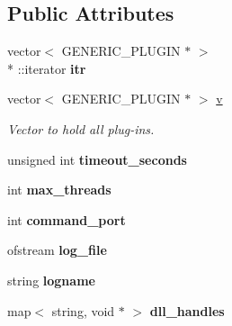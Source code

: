 \subsection*{Public Attributes}
\begin{DoxyCompactItemize}
\item 
\hypertarget{classgeneric__server_a174dc14e1ad533eb80914d6502704c62}{vector$<$ G\-E\-N\-E\-R\-I\-C\-\_\-\-P\-L\-U\-G\-I\-N $\ast$ $>$\\*
\-::iterator {\bfseries itr}}\label{classgeneric__server_a174dc14e1ad533eb80914d6502704c62}

\item 
\hypertarget{classgeneric__server_a3ec385161a1a70bbeabb9c4f9dacaff9}{vector$<$ G\-E\-N\-E\-R\-I\-C\-\_\-\-P\-L\-U\-G\-I\-N $\ast$ $>$ \hyperlink{classgeneric__server_a3ec385161a1a70bbeabb9c4f9dacaff9}{v}}\label{classgeneric__server_a3ec385161a1a70bbeabb9c4f9dacaff9}

\begin{DoxyCompactList}\small\item\em Vector to hold all plug-\/ins. \end{DoxyCompactList}\item 
\hypertarget{classgeneric__server_ab9740042b53c672751f499b529833ae9}{unsigned int {\bfseries timeout\-\_\-seconds}}\label{classgeneric__server_ab9740042b53c672751f499b529833ae9}

\item 
\hypertarget{classgeneric__server_a9eb1da69a8295c19cdd78829f91e358f}{int {\bfseries max\-\_\-threads}}\label{classgeneric__server_a9eb1da69a8295c19cdd78829f91e358f}

\item 
\hypertarget{classgeneric__server_a49946117ec3df868203ff96af1d4ff95}{int {\bfseries command\-\_\-port}}\label{classgeneric__server_a49946117ec3df868203ff96af1d4ff95}

\item 
\hypertarget{classgeneric__server_ad2e902a2f68183250ccf979a80ede5b9}{ofstream {\bfseries log\-\_\-file}}\label{classgeneric__server_ad2e902a2f68183250ccf979a80ede5b9}

\item 
\hypertarget{classgeneric__server_aedf901cbd053eb90c43800b31102b331}{string {\bfseries logname}}\label{classgeneric__server_aedf901cbd053eb90c43800b31102b331}

\item 
\hypertarget{classgeneric__server_a240d5f05f73b4fbc5df8706b015820e1}{map$<$ string, void $\ast$ $>$ {\bfseries dll\-\_\-handles}}\label{classgeneric__server_a240d5f05f73b4fbc5df8706b015820e1}


\end{DoxyCompactItemize}
